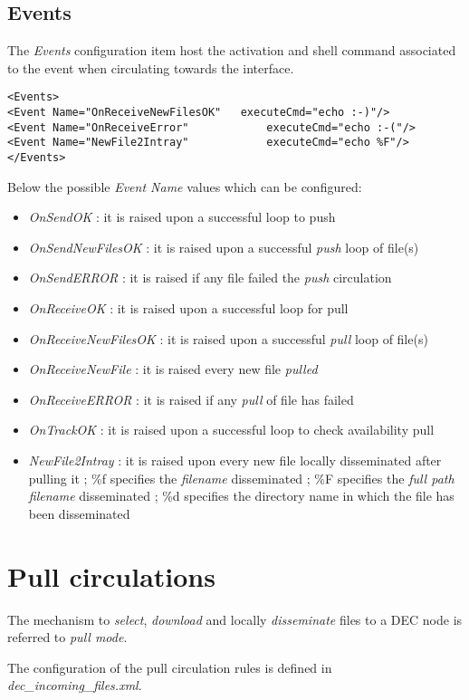 \documentclass[dec_sum_main.tex]{subfiles}
\begin{document}
\subsection{Events}
The \textit{Events} configuration item host the activation and shell command associated to the event when circulating towards the interface.
\begin{lstlisting}
<Events>
<Event Name="OnReceiveNewFilesOK"  	executeCmd="echo :-)"/>
<Event Name="OnReceiveError"            executeCmd="echo :-("/>
<Event Name="NewFile2Intray"            executeCmd="echo %F"/>
</Events>
\end{lstlisting}
\par
\par
\noindent
Below the possible \textit{Event Name} values which can be configured:
\begin{itemize}
	\item \textit{OnSendOK} : it is raised upon a successful loop to push
	\item \textit{OnSendNewFilesOK} : it is raised upon a successful \textit{push} loop of file(s)
	\item \textit{OnSendERROR} : it is raised if any file failed the \textit{push} circulation 
	\item \textit{OnReceiveOK} : it is raised upon a successful loop for pull
	\item \textit{OnReceiveNewFilesOK} : it is raised upon a successful \textit{pull} loop of file(s)
	\item \textit{OnReceiveNewFile} : it is raised every new file \textit{pulled}
	\item \textit{OnReceiveERROR} : it is raised if any \textit{pull} of file has failed
	\item \textit{OnTrackOK} : it is raised upon a successful loop to check availability pull
	\item \textit{NewFile2Intray} :	it is raised upon every new file locally disseminated after pulling it ; \%f specifies the \textit{filename} disseminated ; \%F specifies the \textit{full path filename} disseminated ; \%d specifies the directory name in which the file has been disseminated 					 
\end{itemize}

\section{Pull circulations}

The mechanism to \textit{select}, \textit{download} and locally \textit{disseminate} files to a DEC node is referred to \textit{pull mode}.
\par
\noindent
The configuration of the pull circulation rules is defined in \textit{dec\_incoming\_files.xml}.
\end{document}
